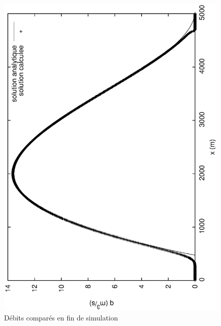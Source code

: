 \documentclass[a4paper,10pt]{article}
\begin{document}
\begin{figure}
 \begin{center}
  \includegraphics[angle=270,width=15cm]{Debit.eps}
  \caption{Débits comparés en fin de simulation}
  \label{fig2}
 \end{center}
\end{figure}




%
%
\end{document}
